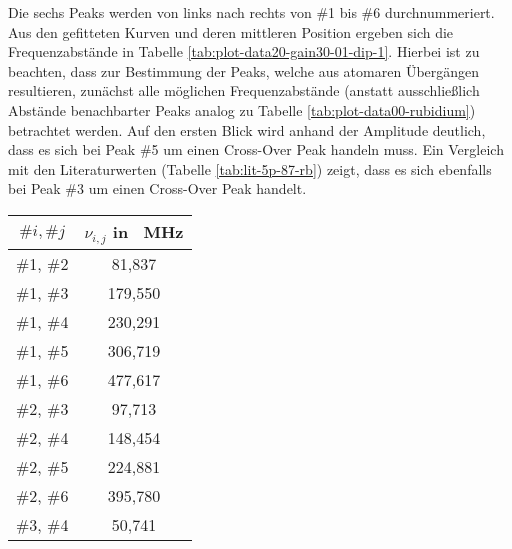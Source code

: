 \noindent Die sechs Peaks werden von links nach rechts von \#1 bis \#6 durchnummeriert. Aus den gefitteten Kurven und deren mittleren Position ergeben sich die Frequenzabstände in Tabelle \ref{tab:plot-data20-gain30-01-dip-1}.
Hierbei ist zu beachten, dass zur Bestimmung der Peaks, welche aus atomaren Übergängen resultieren, zunächst alle möglichen Frequenzabstände (anstatt ausschließlich Abstände benachbarter Peaks analog zu Tabelle \ref{tab:plot-data00-rubidium}) betrachtet werden. Auf den ersten Blick wird anhand der Amplitude deutlich, dass es sich bei Peak \#5 um einen Cross-Over Peak handeln muss. Ein Vergleich mit den Literaturwerten (Tabelle \ref{tab:lit-5p-87-rb}) zeigt, dass es sich ebenfalls bei Peak \#3 um einen Cross-Over Peak handelt. 

\begin{table}[H]
    \begin{minipage}{8cm}
        \centering
        \begin{tabular}{|c|c|}
            \hline
            $\#i, \#j$      &       $\nu_{i,j}$ in \SI{}{\mega \hertz} \\
            \hline
            \hline
            \cellcolor{green!40} \#1, \#2       &   \cellcolor{green!40}     81,837         \\
            \hline
            \cellcolor{red!20}   \#1, \#3       &   \cellcolor{red!20}      179,550         \\
            \hline
            \cellcolor{gray!20}  \#1, \#4       &   \cellcolor{gray!20}     230,291         \\
            \hline
            \cellcolor{red!20}   \#1, \#5       &   \cellcolor{red!20}      306,719         \\
            \hline
            \cellcolor{gray!20}  \#1, \#6       &   \cellcolor{gray!20}     477,617         \\
            \hline
            \cellcolor{red!20}   \#2, \#3       &   \cellcolor{red!20}       97,713         \\
            \hline
            \cellcolor{green!40} \#2, \#4       &   \cellcolor{green!40}    148,454         \\
            \hline
            \cellcolor{red!20}   \#2, \#5       &   \cellcolor{red!20}      224,881         \\
            \hline
            \cellcolor{gray!20}  \#2, \#6       &   \cellcolor{gray!20}     395,780         \\
            \hline
            \cellcolor{red!20}   \#3, \#4       &   \cellcolor{red!20}       50,741         \\

\end{tabular}
\end{minipage}
\end{table}
